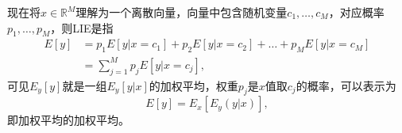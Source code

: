 现在将$x \in \mathbb{R}^{M}$理解为一个离散向量，向量中包含随机变量$c_{1}, \ldots, c_{M}$，对应概率$p_{1}, \ldots, p_{M}$，则LIE是指
\begin{equation}
    \label{eq:qmle-lie-vector}
\begin{split}
    E \left[ y \right] & = p_{1} E \left[ y | x=c_{1} \right]
    +p_{2} E \left[ y | x=c_{2} \right] + \ldots
    + p_{M} E \left[ y | x=c_{M} \right] \\
    & = \sum_{j=1}^{M} p_{j} E \left[ y | x=c_{j} \right],
\end{split}
\end{equation}
可见$E_{y}[y]$就是一组$E_{y}[y|x]$的加权平均，权重$p_{j}$是$x$值取$c_{j}$的概率，可以表示为
\begin{equation}
    E \left[ y \right] = E_{x} \left[ E_{y} \left( y | x \right) \right],
\end{equation}
即加权平均的加权平均。

